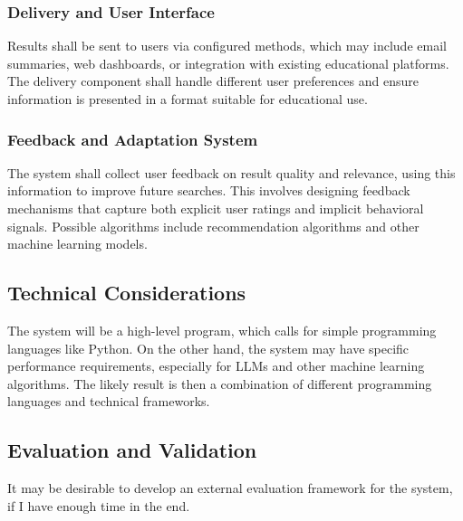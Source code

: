 \documentclass[project-plan]{report-template}
\begin{document}
\subsubsection{Delivery and User Interface} Results shall be sent to users via
configured methods, which may include email summaries, web dashboards, or
integration with existing educational platforms. The delivery component shall
handle different user preferences and ensure information is presented in a
format suitable for educational use.

\subsubsection{Feedback and Adaptation System} The system shall collect user
feedback on result quality and relevance, using this information to improve
future searches. This involves designing feedback mechanisms that capture both
explicit user ratings and implicit behavioral signals. Possible algorithms
include recommendation algorithms and other machine learning models.

\subsection{Technical Considerations} 
The system will be a high-level program, which calls for simple programming
languages like Python. On the other hand, the system may have specific
performance requirements, especially for LLMs and other machine learning
algorithms. The likely result is then a combination of different programming
languages and technical frameworks.

\subsection{Evaluation and Validation} 
It may be desirable to develop an external evaluation framework for the system,
if I have enough time in the end.

\clearpage


\end{document}
